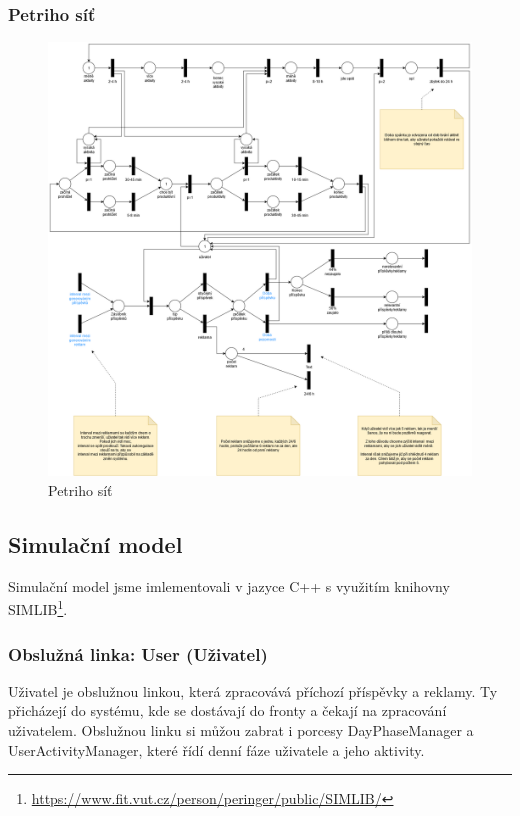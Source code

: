 \documentclass[11pt, a4paper]{article}
\begin{document}
\newpage
\subsubsection{Petriho síť}
\begin{figure}[h]
    \centering
   \includegraphics[width=\linewidth]{petri-net.png}
    \caption{Petriho síť}
\end{figure}
\newpage

\subsection{Simulační model}
Simulační model jsme imlementovali v jazyce C++ s využitím knihovny SIMLIB\footnote{\href{https://www.fit.vut.cz/person/peringer/public/SIMLIB/}{https://www.fit.vut.cz/person/peringer/public/SIMLIB/}}.

\subsubsection{Obslužná linka: User (Uživatel)}
Uživatel je obslužnou linkou, která zpracovává příchozí příspěvky a reklamy. Ty přicházejí do systému, kde se dostávají do fronty a čekají na zpracování uživatelem.
Obslužnou linku si můžou zabrat i porcesy DayPhaseManager a UserActivityManager, které řídí denní fáze uživatele a jeho aktivity.
\end{document}
